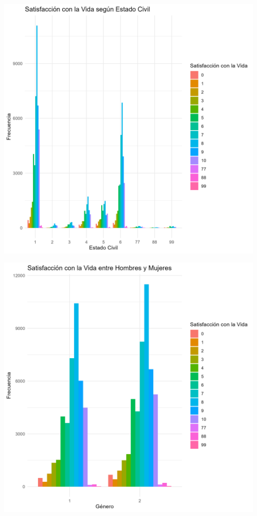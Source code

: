 \documentclass{article}\usepackage[]{graphicx}\usepackage[]{xcolor}
\makeatletter
\def\maxwidth{ %
  \ifdim\Gin@nat@width>\linewidth
    \linewidth
  \else
    \Gin@nat@width
  \fi
}
\makeatother
\begin{document}
\includegraphics[width=\maxwidth]{satisfaccion_vida_estado_civil} 

\includegraphics[width=\maxwidth]{satisfaccion_vida_genero} 
\end{document}
